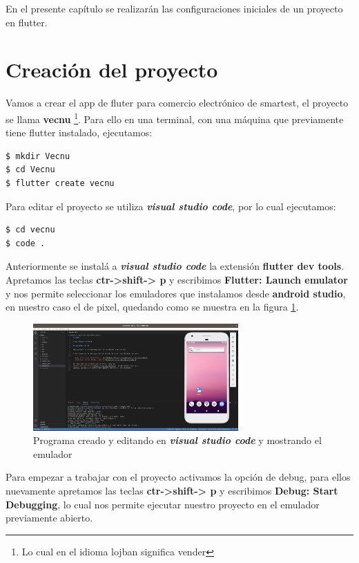 En el presente capítulo se realizarán las configuraciones iniciales de un proyecto en flutter.

\section{Creación del proyecto}

Vamos a crear el app de fluter para comercio electrónico de smartest, el proyecto se llama \textbf{vecnu} \footnote{Lo cual en el idioma lojban significa vender}. Para ello en una terminal, con una máquina que previamente tiene flutter instalado, ejecutamos:


\begin{lstlisting}[language=bash]
$ mkdir Vecnu 
$ cd Vecnu
$ flutter create vecnu
\end{lstlisting}

Para editar el proyecto se utiliza \emph{\textbf{visual studio code}}, por lo cual ejecutamos:

\begin{lstlisting}[language=bash]
$ cd vecnu
$ code .
\end{lstlisting}

Anteriormente se instalá a \emph{\textbf{visual studio code}} la extensión \textbf{flutter dev tools}. Apretamos las teclas \textbf{ctr->shift-> p} y escribimos \textbf{Flutter: Launch emulator} y nos permite seleccionar los emuladores que instalamos desde \textbf{android studio}, en nuestro caso el de pixel, quedando como se muestra en la figura \ref{cap1:001}.

\begin{figure}[htb]
\centering
\includegraphics[width=0.7\textwidth]{capitulo1/emulador_1.png}
\caption{Programa creado y editando en \emph{\textbf{visual studio code}} y mostrando el emulador}
\label{cap1:001}
\end{figure} 

Para empezar a trabajar con el proyecto activamos la opción de debug, para ellos nuevamente apretamos las teclas \textbf{ctr->shift-> p} y escribimos \textbf{Debug: Start Debugging}, lo cual nos permite ejecutar nuestro proyecto en el emulador previamente abierto.

